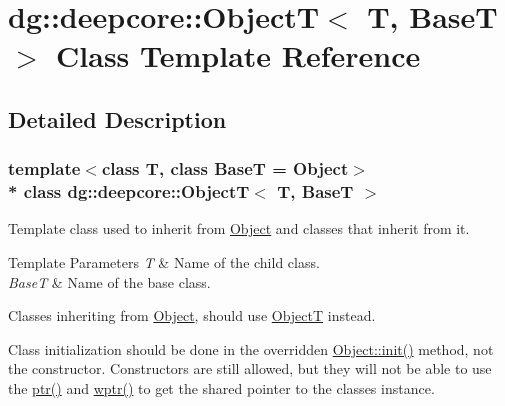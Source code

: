 \hypertarget{classdg_1_1deepcore_1_1_object_t}{}\section{dg\+:\+:deepcore\+:\+:ObjectT$<$ T, BaseT $>$ Class Template Reference}
\label{classdg_1_1deepcore_1_1_object_t}


\subsection{Detailed Description}
\subsubsection*{template$<$class T, class BaseT = Object$>$\\*
class dg\+::deepcore\+::\+Object\+T$<$ T, Base\+T $>$}

Template class used to inherit from \hyperlink{classdg_1_1deepcore_1_1_object}{Object} and classes that inherit from it. 


\begin{DoxyTemplParams}{Template Parameters}
{\em T} & Name of the child class. \\
\hline
{\em BaseT} & Name of the base class.\\
\hline
\end{DoxyTemplParams}
Classes inheriting from \hyperlink{classdg_1_1deepcore_1_1_object}{Object}, should use \hyperlink{classdg_1_1deepcore_1_1_object_t}{ObjectT} instead.

Class initialization should be done in the overridden \hyperlink{classdg_1_1deepcore_1_1_object_a0982aef61087daaf910acfe8b6dcac99}{Object\+::init()} method, not the constructor. Constructors are still allowed, but they will not be able to use the \hyperlink{classdg_1_1deepcore_1_1_object_t_ab2513323757cee301fb419901535f7b1}{ptr()} and \hyperlink{classdg_1_1deepcore_1_1_object_t_aef2b72b73c1d2ab53aebd00742fedfa2}{wptr()} to get the shared pointer to the class\textquotesingle{}es instance.

